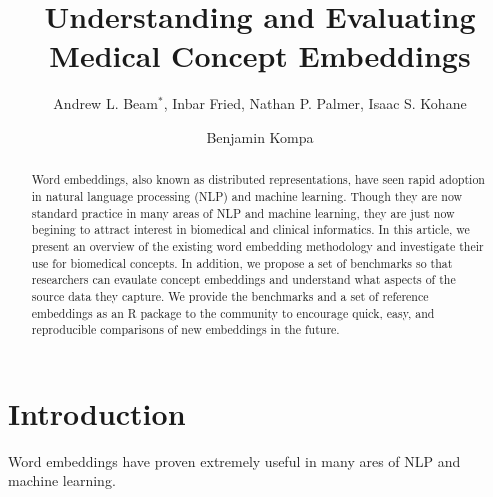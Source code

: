 \documentclass{article}
\begin{document}
\title{Understanding and Evaluating Medical Concept Embeddings}

\author{Andrew L. Beam$^*$, Inbar Fried, Nathan P. Palmer, Isaac S. Kohane}


\author{Benjamin Kompa}


\begin{abstract}
Word embeddings, also known as distributed representations, have seen rapid adoption in natural language processing (NLP) and machine learning. Though they are now standard practice in many areas of NLP and machine learning, they are just now begining to attract interest in biomedical and clinical informatics. In this article, we present an overview of the existing word embedding methodology and investigate their use for biomedical concepts. In addition, we propose a set of benchmarks so that researchers can evaulate concept embeddings and understand what aspects of the source data they capture. We provide the benchmarks and a set of reference embeddings as an R package to the community to encourage quick, easy, and reproducible comparisons of new embeddings in the future.
\end{abstract}



\section{Introduction}\label{aba:intro}
Word embeddings have proven extremely useful in many ares of NLP and machine learning. 
\end{document}
